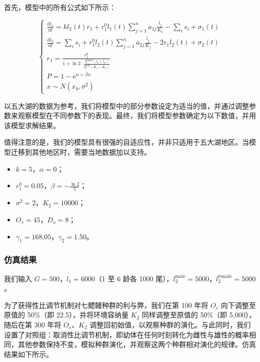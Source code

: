 \documentclass[11pt,a4paper]{ctexart}
\begin{document}
首先，模型中的所有公式如下所示：

\begin{equation}
\left\{
\begin{array}{l}
\frac{\mathrm{d}l_1}{\mathrm{d}t}=k l_2(t)r_1+r_1^{0}l_1(t)\sum\limits_{j=1}^{n}a_{1j}\frac{l_j}{K_j}-\sum\limits_{i}s_i+\sigma_1(t)\\[1.4em]
\frac{\mathrm{d}l_2}{\mathrm{d}t}=\sum\limits_{i}s_i+r_1^{0}l_2(t)\sum\limits_{j=1}^{n}a_{2j}\frac{l_j}{K_j}-2r_1 l_2(t)+\sigma_2(t)\\[1.4em]
r_1=\frac{r_1^{0}}{1+\ln 2\cdot \frac{l_2^{\mathrm{female}}\left(l_1+l_2\right)}{l_2^{\mathrm{male}}\left(K_1+K_2\right)}}\\[1.6em]
P=1-\mathrm{e}^{\alpha+\beta x}\\[0.6em]
x\sim N\left(x_b,\sigma^2\right)
\end{array}
\right.
\end{equation}

以五大湖的数据为参考，我们将模型中的部分参数设定为适当的值，并通过调整参数来观察模型在不同参数下的表现。最终，我们将模型参数确定为以下数值，并用该模型求解结果。

值得注意的是，我们的模型具有很强的自适应性，并非只适用于五大湖地区。当模型迁移到其他地区时，需要当地数据加以支持。

\begin{itemize}
\item $k=5$，$\alpha=0$；
\item $r_1^{0}=0.05$，$\beta=-\frac{\ln 2}{5}$；
\item $\sigma^2=2$，$K_2=10000$；
\item $O_s=45$，$D_o=8$；
\item $\gamma_1=168.05$，$\gamma_2=1.50$。
\end{itemize}

\subsubsection{仿真结果}

我们输入 $G=500$，$l_1=6000$（1 至 6 龄各 1000 尾），$l_2^{\mathrm{male}}=5000$，$l_2^{\mathrm{female}}=5000$。

为了获得性比调节机制对七鳃鳗种群的利与弊，我们在第 100 年将 $O_s$ 向下调整至原值的 50\%（即 22.5），并将环境容纳量 $K_2$ 同样调整至原值的 50\%（即 5,000），随后在第 300 年将 $O_s$、$K_2$ 调整回初始值，以观察种群的演化。与此同时，我们设置了对照组：取消性比调节机制，即幼体在任何时刻转化为雌性与雄性的概率相同，其他参数保持不变，模拟种群演化，并观察这两个种群相对演化的规律。仿真结果如下所示。
\end{document}
